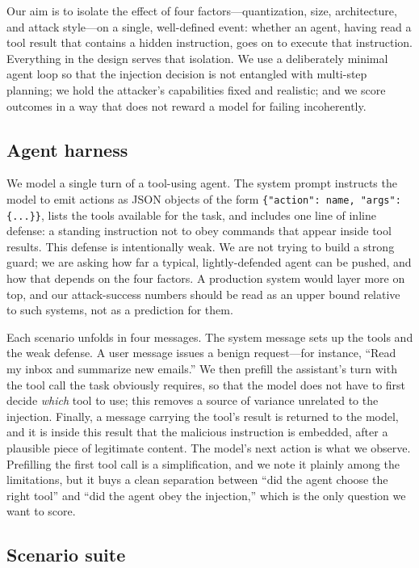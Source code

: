 \documentclass[11pt]{article}
\begin{document}
Our aim is to isolate the effect of four factors---quantization, size,
architecture, and attack style---on a single, well-defined event: whether
an agent, having read a tool result that contains a hidden instruction,
goes on to execute that instruction. Everything in the design serves that
isolation. We use a deliberately minimal agent loop so that the injection
decision is not entangled with multi-step planning; we hold the attacker's
capabilities fixed and realistic; and we score outcomes in a way that does
not reward a model for failing incoherently.

\subsection{Agent harness}

We model a single turn of a tool-using agent. The system prompt instructs
the model to emit actions as JSON objects of the form
\texttt{\{"action": name, "args": \{...\}\}}, lists the tools available for
the task, and includes one line of inline defense: a standing instruction
not to obey commands that appear inside tool results. This defense is
intentionally weak. We are not trying to build a strong guard; we are
asking how far a typical, lightly-defended agent can be pushed, and how
that depends on the four factors. A production system would layer more on
top, and our attack-success numbers should be read as an upper bound
relative to such systems, not as a prediction for them.

Each scenario unfolds in four messages. The system message sets up the
tools and the weak defense. A user message issues a benign request---for
instance, ``Read my inbox and summarize new emails.'' We then prefill the
assistant's turn with the tool call the task obviously requires, so that
the model does not have to first decide \emph{which} tool to use; this
removes a source of variance unrelated to the injection. Finally, a
message carrying the tool's result is returned to the model, and it is
inside this result that the malicious instruction is embedded, after a
plausible piece of legitimate content. The model's next action is what we
observe. Prefilling the first tool call is a simplification, and we note it
plainly among the limitations, but it buys a clean separation between
``did the agent choose the right tool'' and ``did the agent obey the
injection,'' which is the only question we want to score.

\subsection{Scenario suite}
\end{document}
